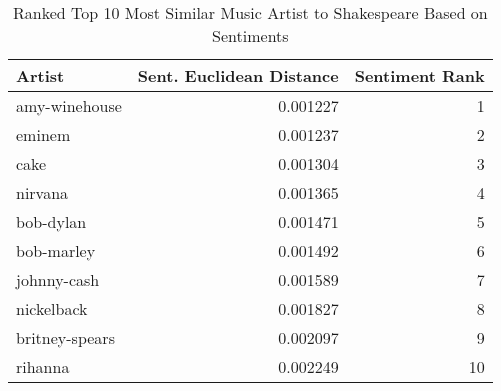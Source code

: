 \begin{table}[ht]
\centering
\begin{tabular}{lrr}
  \hline
Artist & Sent. Euclidean Distance & Sentiment Rank \\ 
  \hline
amy-winehouse & 0.001227 &       1 \\ 
  eminem & 0.001237 &       2 \\ 
  cake & 0.001304 &       3 \\ 
  nirvana & 0.001365 &       4 \\ 
  bob-dylan & 0.001471 &       5 \\ 
  bob-marley & 0.001492 &       6 \\ 
  johnny-cash & 0.001589 &       7 \\ 
  nickelback & 0.001827 &       8 \\ 
  britney-spears & 0.002097 &       9 \\ 
  rihanna & 0.002249 &      10 \\ 
   \hline
\end{tabular}
\caption{Ranked Top 10 Most Similar Music Artist to Shakespeare Based on Sentiments} 
\label{tab:wordranktable}
\end{table}

